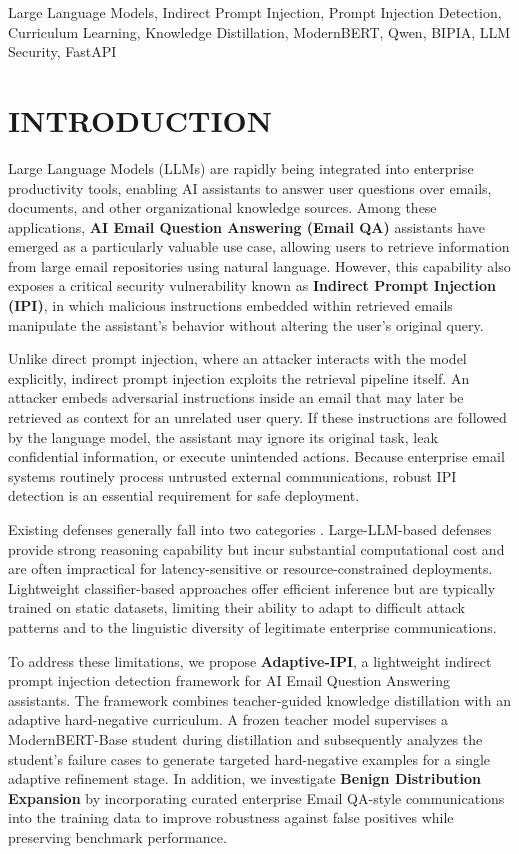 \documentclass[conference]{IEEEtran}
\begin{document}
\begin{IEEEkeywords}
Large Language Models, Indirect Prompt Injection, Prompt Injection Detection, Curriculum Learning,
Knowledge Distillation, ModernBERT, Qwen, BIPIA, LLM Security, FastAPI
\end{IEEEkeywords}

\section{INTRODUCTION}

Large Language Models (LLMs) are rapidly being integrated into enterprise productivity tools,
enabling AI assistants to answer user questions over emails, documents, and other organizational
knowledge sources. Among these applications, \textbf{AI Email Question Answering (Email QA)}
assistants have emerged as a particularly valuable use case, allowing users to retrieve information
from large email repositories using natural language. However, this capability also exposes a
critical security vulnerability known as \textbf{Indirect Prompt Injection (IPI)}, in which
malicious instructions embedded within retrieved emails manipulate the assistant's behavior without
altering the user's original query.

Unlike direct prompt injection, where an attacker interacts with the model explicitly, indirect
prompt injection exploits the retrieval pipeline itself. An attacker embeds adversarial instructions
inside an email that may later be retrieved as context for an unrelated user query. If these
instructions are followed by the language model, the assistant may ignore its original task, leak
confidential information, or execute unintended actions. Because enterprise email systems routinely
process untrusted external communications, robust IPI detection is an essential requirement for safe
deployment.

Existing defenses generally fall into two categories \cite{ref1, ref2}. Large-LLM-based defenses
provide strong reasoning capability but incur substantial computational cost and are often
impractical for latency-sensitive or resource-constrained deployments. Lightweight classifier-based
approaches offer efficient inference but are typically trained on static datasets, limiting their
ability to adapt to difficult attack patterns and to the linguistic diversity of legitimate
enterprise communications.

To address these limitations, we propose \textbf{Adaptive-IPI}, a lightweight indirect prompt
injection detection framework for AI Email Question Answering assistants. The framework combines
teacher-guided knowledge distillation with an adaptive hard-negative curriculum. A frozen teacher
model supervises a ModernBERT-Base student during distillation and subsequently analyzes the
student's failure cases to generate targeted hard-negative examples for a single adaptive refinement
stage. In addition, we investigate \textbf{Benign Distribution Expansion} by incorporating curated
enterprise Email QA-style communications into the training data to improve robustness against false
positives while preserving benchmark performance.
\end{document}
